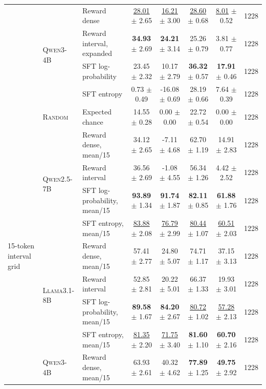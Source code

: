 \begin{table}[t]
\begin{tabular}{lllccccc}
\addlinespace[1pt]
 & \multirow{4}{*}{\textsc{Qwen3-4B}} & Reward dense & \underline{28.01} $\pm$ 2.65 & \underline{16.21} $\pm$ 3.00 & \underline{28.60} $\pm$ 0.68 & \underline{8.01} $\pm$ 0.52 & 1228 \\
 &  & Reward interval, expanded & \textbf{34.93} $\pm$ 2.69 & \textbf{24.21} $\pm$ 3.14 & 25.26 $\pm$ 0.79 & 3.81 $\pm$ 0.77 & 1228 \\
 &  & SFT log-probability & 23.45 $\pm$ 2.32 & 10.17 $\pm$ 2.79 & \textbf{36.32} $\pm$ 0.57 & \textbf{17.91} $\pm$ 0.46 & 1228 \\
 &  & SFT entropy & 0.73 $\pm$ 0.49 & -16.08 $\pm$ 0.69 & 28.19 $\pm$ 0.66 & 7.64 $\pm$ 0.39 & 1228 \\
 & \textsc{Random} & Expected chance & 14.55 $\pm$ 0.28 & 0.00 $\pm$ 0.00 & 22.72 $\pm$ 0.54 & 0.00 $\pm$ 0.00 & 1228 \\
\midrule
\multirow{12}{*}{15-token interval grid} & \multirow{4}{*}{\textsc{Qwen2.5-7B}} & Reward dense, mean/15 & 34.12 $\pm$ 2.65 & -7.11 $\pm$ 4.68 & 62.70 $\pm$ 1.19 & 14.91 $\pm$ 2.83 & 1228 \\
 &  & Reward interval & 36.56 $\pm$ 2.69 & -1.08 $\pm$ 4.55 & 56.34 $\pm$ 1.26 & 4.42 $\pm$ 2.52 & 1228 \\
 &  & SFT log-probability, mean/15 & \textbf{93.89} $\pm$ 1.34 & \textbf{91.74} $\pm$ 1.87 & \textbf{82.11} $\pm$ 0.85 & \textbf{61.88} $\pm$ 1.76 & 1228 \\
 &  & SFT entropy, mean/15 & \underline{83.88} $\pm$ 2.08 & \underline{76.79} $\pm$ 2.99 & \underline{80.44} $\pm$ 1.07 & \underline{60.51} $\pm$ 2.03 & 1228 \\
\addlinespace[1pt]
 & \multirow{4}{*}{\textsc{Llama3.1-8B}} & Reward dense, mean/15 & 57.41 $\pm$ 2.77 & 24.80 $\pm$ 5.07 & 74.71 $\pm$ 1.17 & 37.15 $\pm$ 3.13 & 1228 \\
 &  & Reward interval & 52.85 $\pm$ 2.81 & 20.22 $\pm$ 5.01 & 66.37 $\pm$ 1.33 & 19.93 $\pm$ 3.01 & 1228 \\
 &  & SFT log-probability, mean/15 & \textbf{89.58} $\pm$ 1.67 & \textbf{84.20} $\pm$ 2.67 & \underline{80.72} $\pm$ 1.02 & \underline{57.28} $\pm$ 2.13 & 1228 \\
 &  & SFT entropy, mean/15 & \underline{81.35} $\pm$ 2.20 & \underline{71.75} $\pm$ 3.40 & \textbf{81.60} $\pm$ 1.10 & \textbf{60.70} $\pm$ 2.16 & 1228 \\
\addlinespace[1pt]
 & \multirow{4}{*}{\textsc{Qwen3-4B}} & Reward dense, mean/15 & 63.93 $\pm$ 2.61 & 40.32 $\pm$ 4.62 & \textbf{77.89} $\pm$ 1.25 & \textbf{49.75} $\pm$ 2.92 & 1228 \\

\end{tabular}
\end{table}
